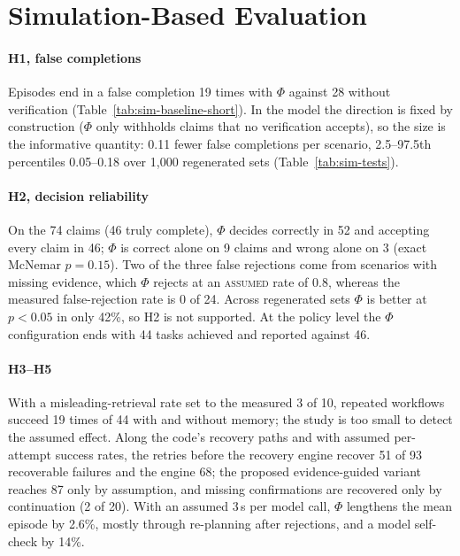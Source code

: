 \section{Simulation-Based Evaluation}
\label{sec:sim-results}

\noindent{}



\paragraph{H1, false completions} Episodes end in a false completion 19 times with $\Phi$ against 28 without verification (Table~\ref{tab:sim-baseline-short}). In the model the direction is fixed by construction ($\Phi$ only withholds claims that no verification accepts), so the size is the informative quantity: 0.11 fewer false completions per scenario, 2.5--97.5th percentiles 0.05--0.18 over 1{,}000 regenerated sets (Table~\ref{tab:sim-tests}).

\paragraph{H2, decision reliability} On the 74 claims (46 truly complete), $\Phi$ decides correctly in 52 and accepting every claim in 46; $\Phi$ is correct alone on 9 claims and wrong alone on 3 (exact McNemar $p=0.15$). Two of the three false rejections come from scenarios with missing evidence, which $\Phi$ rejects at an \textsc{assumed} rate of 0.8, whereas the measured false-rejection rate is 0 of 24. Across regenerated sets $\Phi$ is better at $p<0.05$ in only 42\%, so H2 is not supported. At the policy level the $\Phi$ configuration ends with 44 tasks achieved and reported against 46.

\paragraph{H3--H5} With a misleading-retrieval rate set to the measured 3 of 10, repeated workflows succeed 19 times of 44 with and without memory; the study is too small to detect the assumed effect. Along the code's recovery paths and with assumed per-attempt success rates, the retries before the recovery engine recover 51 of 93 recoverable failures and the engine 68; the proposed evidence-guided variant reaches 87 only by assumption, and missing confirmations are recovered only by continuation (2 of 20). With an assumed 3\,s per model call, $\Phi$ lengthens the mean episode by 2.6\%, mostly through re-planning after rejections, and a model self-check by 14\%.

